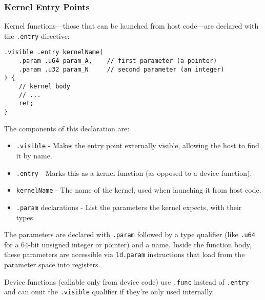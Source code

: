 \subsubsection{Kernel Entry Points}

Kernel functions—those that can be launched from host code—are declared with the \texttt{.entry} directive:

\begin{lstlisting}[style=ptx]
.visible .entry kernelName(
    .param .u64 param_A,    // first parameter (a pointer)
    .param .u32 param_N     // second parameter (an integer)
) {
    // kernel body
    // ...
    ret;
}
\end{lstlisting}

The components of this declaration are:

\begin{itemize}
    \item \texttt{.visible} - Makes the entry point externally visible, allowing the host to find it by name.
    
    \item \texttt{.entry} - Marks this as a kernel function (as opposed to a device function).
    
    \item \texttt{kernelName} - The name of the kernel, used when launching it from host code.
    
    \item \texttt{.param} declarations - List the parameters the kernel expects, with their types.
\end{itemize}

The parameters are declared with \texttt{.param} followed by a type qualifier (like \texttt{.u64} for a 64-bit unsigned integer or pointer) and a name. Inside the function body, these parameters are accessible via \texttt{ld.param} instructions that load from the parameter space into registers.

Device functions (callable only from device code) use \texttt{.func} instead of \texttt{.entry} and can omit the \texttt{.visible} qualifier if they're only used internally.


